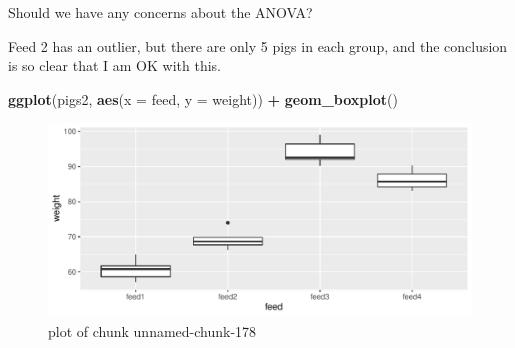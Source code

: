 \documentclass[ignorenonframetext,]{beamer}
\newenvironment{Shaded}{\begin{snugshade}}{\end{snugshade}}
\newcommand{\DataTypeTok}[1]{\textcolor[rgb]{0.13,0.29,0.53}{#1}}
\newcommand{\KeywordTok}[1]{\textcolor[rgb]{0.13,0.29,0.53}{\textbf{#1}}}
\newcommand{\NormalTok}[1]{#1}
\newcommand{\OperatorTok}[1]{\textcolor[rgb]{0.81,0.36,0.00}{\textbf{#1}}}
\newcommand{\StringTok}[1]{\textcolor[rgb]{0.31,0.60,0.02}{#1}}
\begin{document}
\begin{frame}[fragile]{Should we have any concerns about the ANOVA?}
\protect\hypertarget{should-we-have-any-concerns-about-the-anova}{}

Feed 2 has an outlier, but there are only 5 pigs in each group, and the
conclusion is so clear that I am OK with this.

\begin{Shaded}
\begin{Highlighting}[]
\KeywordTok{ggplot}\NormalTok{(pigs2, }\KeywordTok{aes}\NormalTok{(}\DataTypeTok{x =}\NormalTok{ feed, }\DataTypeTok{y =}\NormalTok{ weight)) }\OperatorTok{+}\StringTok{ }\KeywordTok{geom_boxplot}\NormalTok{()}
\end{Highlighting}
\end{Shaded}

\begin{figure}
\centering
\includegraphics{figure/unnamed-chunk-178-1.pdf}
\caption{plot of chunk unnamed-chunk-178}
\end{figure}

\end{frame}
\end{document}
